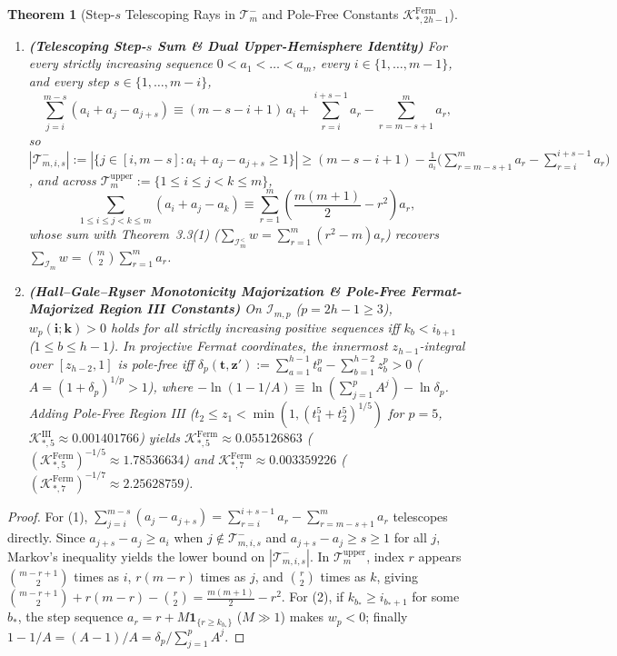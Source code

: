 \documentclass[11pt,a4paper]{article}
\newtheorem{theorem}{Theorem}[section]
\theoremstyle{remark}
\begin{document}
\begin{theorem}[Step-$s$ Telescoping Rays in $\mathcal{T}_m^-$ and Pole-Free Constants $\mathcal{K}_{*, 2h-1}^{\mathrm{Ferm}}$]
\begin{enumerate}
  \item \textbf{(Telescoping Step-$s$ Sum \& Dual Upper-Hemisphere Identity)} For every strictly increasing sequence $0 < a_1 < \dots < a_m$, every $i \in \{1, \dots, m - 1\}$, and every step $s \in \{1, \dots, m - i\}$,
  \[
    \sum_{j=i}^{m-s} (a_i + a_j - a_{j+s}) \equiv (m - s - i + 1)\,a_i + \sum_{r=i}^{i+s-1} a_r - \sum_{r=m-s+1}^m a_r,
  \]
  so $|\mathcal{T}_{m, i, s}^-| := |\{j \in [i, m-s] : a_i + a_j - a_{j+s} \ge 1\}| \ge (m - s - i + 1) - \frac{1}{a_i}\bigl(\sum_{r=m-s+1}^m a_r - \sum_{r=i}^{i+s-1} a_r\bigr)$, and across $\mathcal{T}_m^{\mathrm{upper}} := \{1 \le i \le j < k \le m\}$,
  \[
    \sum_{1 \le i \le j < k \le m} (a_i + a_j - a_k) \equiv \sum_{r=1}^m \left(\frac{m(m + 1)}{2} - r^2\right) a_r,
  \]
  whose sum with Theorem~3.3(1) ($\sum_{\mathcal{I}_m^{<}} w = \sum_{r=1}^m (r^2 - m) a_r$) recovers $\sum_{\mathcal{I}_m} w = \binom{m}{2}\sum_{r=1}^m a_r$.
  \item \textbf{(Hall--Gale--Ryser Monotonicity Majorization \& Pole-Free Fermat-Majorized Region III Constants)} On $\mathcal{I}_{m, p}$ ($p = 2h - 1 \ge 3$), $w_p(\mathbf{i}; \mathbf{k}) > 0$ holds for all strictly increasing positive sequences iff $k_b < i_{b+1}$ ($1 \le b \le h - 1$). In projective Fermat coordinates, the innermost $z_{h-1}$-integral over $[z_{h-2}, 1]$ is pole-free iff $\delta_p(\mathbf{t}, \mathbf{z}') := \sum_{a=1}^{h-1} t_a^p - \sum_{b=1}^{h-2} z_b^p > 0$ ($A = (1+\delta_p)^{1/p} > 1$), where $-\ln(1 - 1/A) \equiv \ln(\sum_{j=1}^p A^j) - \ln\delta_p$. Adding Pole-Free Region III ($t_2 \le z_1 < \min(1, (t_1^5+t_2^5)^{1/5})$ for $p = 5$, $\mathcal{K}_{*, 5}^{\mathrm{III}} \approx 0.001401766$) yields $\mathcal{K}_{*, 5}^{\mathrm{Ferm}} \approx 0.055126863$ ($(\mathcal{K}_{*, 5}^{\mathrm{Ferm}})^{-1/5} \approx 1.78536634$) and $\mathcal{K}_{*, 7}^{\mathrm{Ferm}} \approx 0.003359226$ ($(\mathcal{K}_{*, 7}^{\mathrm{Ferm}})^{-1/7} \approx 2.25628759$).
\end{enumerate}
\end{theorem}

\begin{proof}
For (1), $\sum_{j=i}^{m-s} (a_j - a_{j+s}) = \sum_{r=i}^{i+s-1} a_r - \sum_{r=m-s+1}^m a_r$ telescopes directly. Since $a_{j+s} - a_j \ge a_i$ when $j \notin \mathcal{T}_{m,i,s}^-$ and $a_{j+s} - a_j \ge s \ge 1$ for all $j$, Markov's inequality yields the lower bound on $|\mathcal{T}_{m,i,s}^-|$. In $\mathcal{T}_m^{\mathrm{upper}}$, index $r$ appears $\binom{m-r+1}{2}$ times as $i$, $r(m-r)$ times as $j$, and $\binom{r}{2}$ times as $k$, giving $\binom{m-r+1}{2} + r(m-r) - \binom{r}{2} = \frac{m(m+1)}{2} - r^2$. For (2), if $k_{b_*} \ge i_{b_*+1}$ for some $b_*$, the step sequence $a_r = r + M\mathbf{1}_{\{r \ge k_{b_*}\}}$ ($M \gg 1$) makes $w_p < 0$; finally $1 - 1/A = (A - 1)/A = \delta_p / \sum_{j=1}^p A^j$.
\end{proof}
\end{document}
